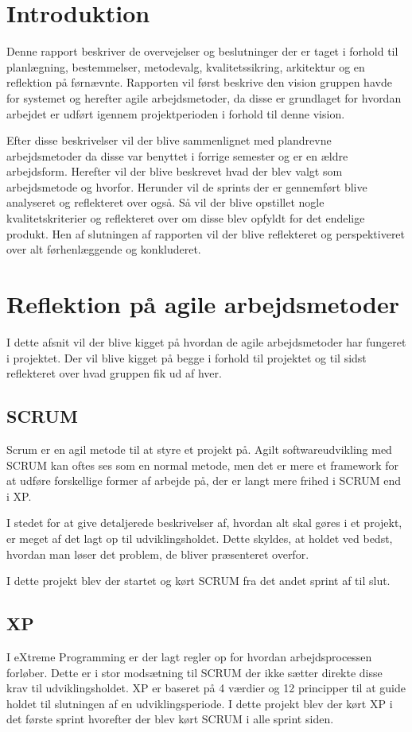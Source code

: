 \section{Introduktion}\label{intro}
Denne rapport beskriver de overvejelser og beslutninger der er taget i forhold til planlægning, bestemmelser, metodevalg, kvalitetssikring, arkitektur og en reflektion på førnævnte. Rapporten vil først beskrive den vision gruppen havde for systemet og herefter agile arbejdsmetoder, da disse er grundlaget for hvordan arbejdet er udført igennem projektperioden i forhold til denne vision.

\nl

Efter disse beskrivelser vil der blive sammenlignet med plandrevne arbejdsmetoder da disse var benyttet i forrige semester og er en ældre arbejdsform. Herefter vil der blive beskrevet hvad der blev valgt som arbejdsmetode og hvorfor. Herunder vil de sprints der er gennemført blive analyseret og reflekteret over også. Så vil der blive opstillet nogle kvalitetskriterier og reflekteret over om disse blev opfyldt for det endelige produkt. Hen af slutningen af rapporten vil der blive reflekteret og perspektiveret over alt førhenlæggende og konkluderet.

\section{Reflektion på agile arbejdsmetoder}
I dette afsnit vil der blive kigget på hvordan de agile arbejdsmetoder har fungeret i projektet. Der vil blive kigget på begge i forhold til projektet og til sidst reflekteret over hvad gruppen fik ud af hver.
\subsection{SCRUM}
Scrum er en agil metode til at styre et projekt på. Agilt softwareudvikling med SCRUM kan oftes ses som en normal metode, men det er mere et framework for at udføre forskellige former af arbejde på, der er langt mere frihed i SCRUM end i XP.

\nl

I stedet for at give detaljerede beskrivelser af, hvordan alt skal gøres i et projekt, er meget af det lagt op til udviklingsholdet. Dette skyldes, at holdet ved bedst, hvordan man løser det problem, de bliver præsenteret overfor.

\nl

I dette projekt blev der startet og kørt SCRUM fra det andet sprint af til slut. 
\subsection{XP}
I eXtreme Programming er der lagt regler op for hvordan arbejdsprocessen forløber. Dette er i stor modsætning til SCRUM der ikke sætter direkte disse krav til udviklingsholdet. XP er baseret på 4 værdier og 12 principper til at guide holdet til slutningen af en udviklingsperiode. I dette projekt blev der kørt XP i det første sprint hvorefter der blev kørt SCRUM i alle sprint siden.

